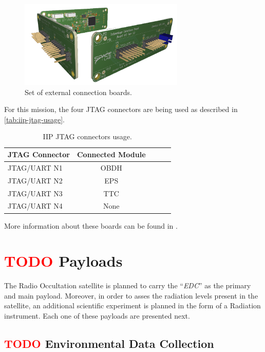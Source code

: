 \begin{figure}[!ht]
    \begin{center}
        \includegraphics[width=0.7\textwidth]{figures/subsystems/iip_fullset}
        \caption{Set of external connection boards.}
        \label{fig:iip-boards}
    \end{center}
\end{figure}

For this mission, the four JTAG connectors are being used as described in \autoref{tab:iip-jtag-usage}.

\begin{table}[!h]
    \centering
    \begin{tabular}{lcccc}
        \toprule[1.5pt]
        \textbf{JTAG Connector} & \textbf{Connected Module} \\
        \midrule
        JTAG/UART N1 & OBDH \\
        JTAG/UART N2 & EPS \\
        JTAG/UART N3 & TTC \\
        JTAG/UART N4 & None \\
        \bottomrule[1.5pt]
    \end{tabular}
    \caption{IIP JTAG connectors usage.}
    \label{tab:iip-jtag-usage}
\end{table}

More information about these boards can be found in \cite{iip}.

\section{ \textcolor{red}{TODO} Payloads}

The Radio Occultation satellite is planned to carry the ``\textit{EDC}'' as the primary and main payload. Moreover, in order to asses the radiation levels present in the satellite, an additional scientific experiment is planned in the form of a Radiation instrument. Each one of these payloads are presented next.

\subsection{ \textcolor{red}{TODO} Environmental Data Collection}

